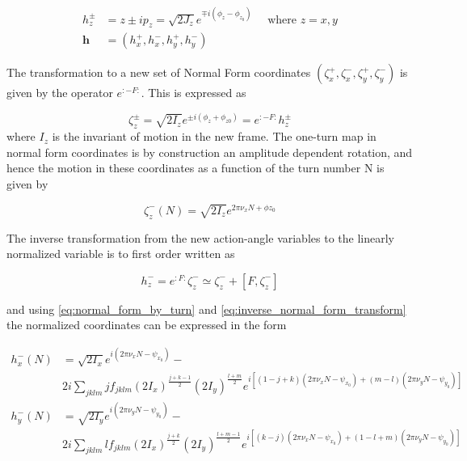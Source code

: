 \begin{equation}
    \begin{aligned}
    h_{z}^{\pm} &= z \pm i p_{z} = \sqrt{2 J_{z}} e^{\mp i \left(\phi_{z}-\phi_{z_{0}}\right)} \quad \text { where } z=x, y \\
    \mathbf{h} &= \left( h_{x}^{+}, h_{x}^{-}, h_{y}^{+}, h_{y}^{-} \right)
    \end{aligned}
    \label{eq:resonant_basis_h}
\end{equation}

The transformation to a new set of Normal Form coordinates \(\left(\zeta_{x}^{+}, \zeta_{x}^{-}, \zeta_{y}^{+}, \zeta_{y}^{-}\right)\) is given by the operator \(e^{: -F :}\).
This is expressed as

\begin{equation}
    \zeta_{z}^{\pm} = \sqrt{2 I_{z}} e^{\pm i \left(\phi_{z}+\phi_{z 0} \right)} = e^{:-F:} h_{z}^{\pm}
    \label{eq:action_angle_to_normal_form}
\end{equation}
where \(I_{z}\) is the invariant of motion in the new frame.
The one-turn map in normal form coordinates is by construction an amplitude dependent rotation, and hence the motion in these coordinates as a function of the turn number N is given by

\begin{equation}
    \zeta_{z}^{-}(N) = \sqrt{2 I_{z}} e^{2 \pi \nu_{x} N + \phi z_{0}}
    \label{eq:normal_form_by_turn}
\end{equation}

The inverse transformation from the new action-angle variables to the linearly normalized variable is to first order written as

\begin{equation}
    h_{z}^{-} = e^{: F:} \zeta_{z}^{-} \simeq \zeta_{z}^{-} + \left[F, \zeta_{z}^{-}\right]
    \label{eq:inverse_normal_form_transform}
\end{equation}

and using \cref{eq:normal_form_by_turn} and \cref{eq:inverse_normal_form_transform} the normalized coordinates can be expressed in the form

\begin{equation}
    \begin{aligned}
    h_{x}^{-}(N) &= \sqrt{2 I_{x}} e^{i\left(2 \pi \nu_{x} N - \psi_{x_{0}}\right)} - \\
    & 2 i \sum_{jklm} j f_{jklm} \left(2 I_{x}\right)^{\frac{j+k-1}{2}} \left(2 I_{y}\right)^{\frac{l+m}{2}} e^{i \left[(1-j+k) \left(2 \pi \nu_{x} N-\psi_{x_{0}}\right) + (m-l) \left(2 \pi \nu_{y} N-\psi_{y_{0}}\right) \right]} \\
    h_{y}^{-}(N) &= \sqrt{2 I_{y}} e^{i\left(2 \pi \nu_{y} N - \psi_{y_{0}}\right)} - \\
    & 2 i \sum_{jklm} l f_{jklm} \left(2 I_{x}\right)^{\frac{j+k}{2}} \left(2 I_{y}\right)^{\frac{l+m-1}{2}} e^{i \left[(k-j) \left(2 \pi \nu_{x} N-\psi_{x_{0}}\right) + (1-l+m) \left(2 \pi \nu_{y} N-\psi_{y_{0}}\right) \right]}
    \end{aligned}
    \label{eq:normal_form_coordinates}
\end{equation}

